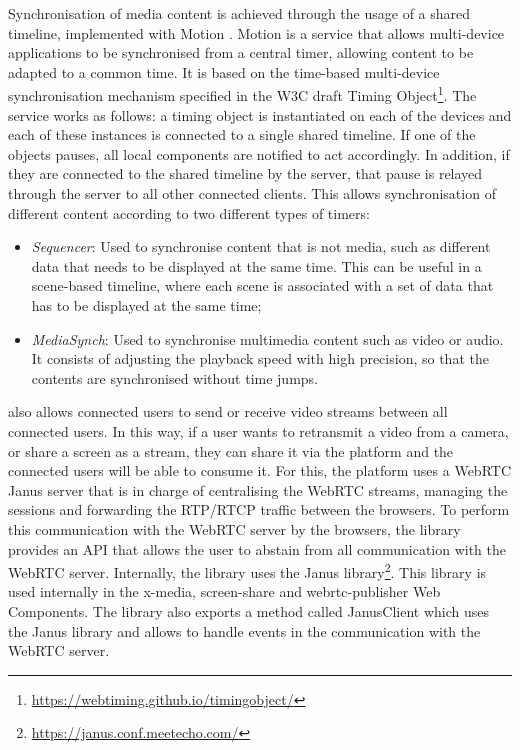 Synchronisation of media content is achieved through the usage of a shared timeline, implemented with Motion \citep{boronat2017hybrid, montagud2018mediasync}. Motion is a service that allows multi-device applications to be synchronised from a central timer, allowing content to be adapted to a common time. It is based on the time-based multi-device synchronisation mechanism specified in the W3C draft Timing Object\footnote{\url{https://webtiming.github.io/timingobject/}}.
The service works as follows: a timing object is instantiated on each of the devices and each of these instances is connected to a single shared timeline. If one of the objects pauses, all local components are notified to act accordingly. In addition, if they are connected to the shared timeline by the server, that pause is relayed through the server to all other connected clients.
This allows synchronisation of different content according to two different types of timers:
\begin{itemize}
    \item \textit{Sequencer}: Used to synchronise content that is not media, such as different data that needs to be displayed at the same time. This can be useful in a scene-based timeline, where each scene is associated with a set of data that has to be displayed at the same time;
    \item \textit{MediaSynch}: Used to synchronise multimedia content such as video or audio. It consists of adjusting the playback speed with high precision, so that the contents are synchronised without time jumps.
\end{itemize}

\ork{} also allows connected users to send or receive video streams between all connected users. In this way, if a user wants to retransmit a video from a camera, or share a screen as a stream, they can share it via the platform and the connected users will be able to consume it. For this, the platform uses a WebRTC Janus server that is in charge of centralising the WebRTC streams, managing the sessions and forwarding the RTP/RTCP traffic between the browsers. To perform this communication with the WebRTC server by the browsers, the library provides an API that allows the user to abstain from all communication with the WebRTC server. Internally, the library uses the Janus library\footnote{\url{https://janus.conf.meetecho.com/}}. This library is used internally in the x-media, screen-share and webrtc-publisher Web Components. The library also exports a method called JanusClient which uses the Janus library and allows to handle events in the communication with the WebRTC server.

